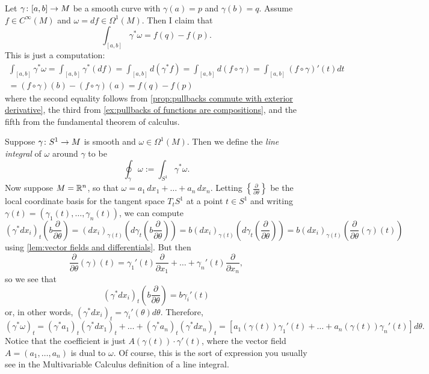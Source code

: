 \begin{example}\label{ex:integrating along a curve}
	Let $\gamma \colon\thinspace\! [a,b] \to M$ be a smooth curve with $\gamma(a) = p$ and $\gamma(b) = q$. Assume $f \in C^\infty(M)$ and $\omega = df \in \Omega^1(M)$. Then I claim that
	\[
		\int_{[a,b]} \gamma^\ast \omega = f(q) - f(p).
	\]
	This is just a computation:
	\begin{multline*}
		\int_{[a,b]} \gamma^\ast \omega = \int_{[a,b]}\gamma^\ast(df) = \int_{[a,b]} d (\gamma^\ast f) = \int_{[a,b]} d(f \circ \gamma) = \int_{[a,b]}(f \circ \gamma)'(t)dt \\
		= (f \circ \gamma)(b) - (f\circ \gamma)(a) = f(q)-f(p)
	\end{multline*}
	where the second equality follows from \cref{prop:pullbacks commute with exterior derivative}, the third from \cref{ex:pullbacks of functions are compositions}, and the fifth from the fundamental theorem of calculus.
\end{example}

\begin{example}\label{ex:line integral}
	Suppose $\gamma \colon\thinspace\! S^1 \to M$ is smooth and $\omega \in \Omega^1(M)$. Then we define the \emph{line integral} of $\omega$ around $\gamma$ to be
	\[
		\oint_\gamma \omega := \int_{S^1} \gamma^\ast \omega.
	\]
	Now suppose $M = \mathbb{R}^n$, so that $\omega = a_1 \, dx_1 + \dots + a_n \, dx_n$. Letting $\left\{\frac{\partial}{\partial \theta}\right\}$ be the local coordinate basis for the tangent space $T_t S^1$ at a point $t \in S^1$ and writing $\gamma(t) = (\gamma_1(t), \dots , \gamma_n(t))$, we can compute
	\[
		(\gamma^\ast dx_i)_t \left(b \frac{\partial}{\partial \theta} \right) = (dx_i)_{\gamma(t)} \left(d\gamma_t\left(b \frac{\partial}{\partial \theta}\right)\right) = b (dx_i)_{\gamma(t)} \left(d\gamma_t\left(\frac{\partial}{\partial \theta}\right)\right) = b (dx_i)_{\gamma(t)} \left(\frac{\partial}{\partial \theta}(\gamma)(t)\right) 
	\]
	using \cref{lem:vector fields and differentials}. But then
	\[
		\frac{\partial}{\partial \theta}(\gamma)(t) = \gamma_1'(t) \frac{\partial}{\partial x_1} + \dots + \gamma_n'(t) \frac{\partial}{\partial x_n},
	\]
	so we see that 
	\[
		(\gamma^\ast dx_i)_t \left(b \frac{\partial}{\partial \theta} \right) = b \gamma_i'(t)
	\]
	or, in other words, $(\gamma^\ast dx_i)_t = \gamma_i'(\theta)d\theta$. Therefore,
	\[
		(\gamma^\ast \omega)_t = (\gamma^\ast a_1)_t (\gamma^\ast dx_1)_t + \dots + (\gamma^\ast a_n)_t (\gamma^\ast dx_n)_t = \left[a_1(\gamma(t)) \gamma_1'(t) + \dots + a_n(\gamma(t))\gamma_n'(t)\right] d\theta.
	\]
	Notice that the coefficient is just $A(\gamma(t))\cdot \gamma'(t)$, where the vector field $A = (a_1, \dots , a_n)$ is dual to $\omega$. Of course, this is the sort of expression you usually see in the Multivariable Calculus definition of a line integral.
\end{example}

